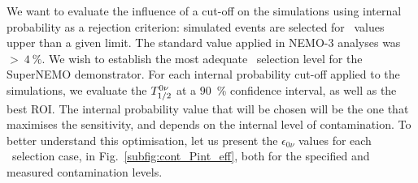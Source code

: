We want to evaluate the influence of a cut-off on the simulations using internal probability as a rejection criterion: simulated events are selected for \Pint\ values upper than a given limit.
The standard value applied in NEMO-$3$ analyses was \Pint~$>~4~\%$.
We wish to establish the most adequate \Pint\ selection level for the SuperNEMO demonstrator.
For each internal probability cut-off applied to the simulations, we evaluate the $T_{1/2}^{0\nu}$ at a $90$~\% confidence interval, as well as the best ROI.
The internal probability value that will be chosen will be the one that maximises the sensitivity, and depends on the internal level of contamination.
To better understand this optimisation, let us present the $\epsilon_{0\nu}$ values for each \Pint\ selection case, in Fig.~\ref{subfig:cont_Pint_eff}, both for the specified and measured contamination levels.
